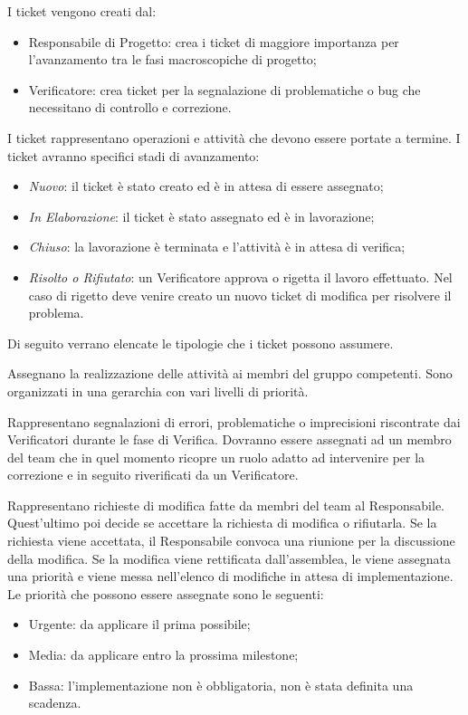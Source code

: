 \label{8.3}
I ticket vengono creati dal:
\begin{itemize}
\item Responsabile di Progetto: crea i ticket di maggiore importanza per l'avanzamento tra le fasi macroscopiche di progetto;
\item Verificatore: crea ticket per la segnalazione di problematiche o bug che necessitano di controllo e correzione.
\end{itemize}

\label{8.4}
I ticket rappresentano operazioni e attività che devono essere portate a termine.
I ticket avranno specifici stadi di avanzamento:
\begin{itemize}
\item \emph{Nuovo}: il ticket è stato creato ed è in attesa di essere assegnato;
\item \emph{In Elaborazione}: il ticket è stato assegnato ed è in lavorazione;
\item \emph{Chiuso}: la lavorazione è terminata e l'attività è in attesa di verifica;
\item \emph{Risolto o Rifiutato}: un Verificatore approva o rigetta il lavoro effettuato. Nel caso di rigetto deve venire creato un nuovo ticket di modifica per risolvere il problema.
\end{itemize}
Di seguito verrano elencate le tipologie che i ticket possono assumere.

\label{8.4.2}
Assegnano la realizzazione delle attività ai membri del gruppo competenti. Sono organizzati in una gerarchia con vari livelli di priorità.

\label{8.4.3}
Rappresentano segnalazioni di errori, problematiche o imprecisioni riscontrate dai Verificatori durante le fase di Verifica. Dovranno essere assegnati ad un membro del team che in quel momento ricopre un ruolo adatto ad intervenire per la correzione e in seguito riverificati da un Verificatore.


\label{8.4.4}
Rappresentano richieste di modifica fatte da membri del team al Responsabile. Quest'ultimo poi decide se accettare la richiesta di modifica o rifiutarla. Se la richiesta viene accettata, il Responsabile convoca una riunione per la discussione della modifica. Se la modifica viene rettificata dall'assemblea, le viene assegnata una priorità e viene messa nell'elenco di modifiche in attesa di implementazione.
Le priorità che possono essere assegnate sono le seguenti:
\begin{itemize}
\item Urgente: da applicare il prima possibile;
\item Media: da applicare entro la prossima milestone;
\item Bassa: l'implementazione non è obbligatoria, non è stata definita una scadenza.
\end{itemize}

